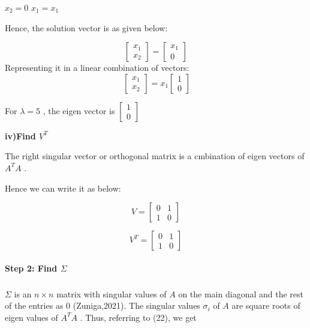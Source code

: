 \documentclass[a4paper]{report}
\begin{document}
$x_2=0$
$x_1=x_1$ 

Hence, the solution vector is as given below:

\[\begin{bmatrix}
    x_1\\x_2
\end{bmatrix}=\begin{bmatrix}
    x_1\\0
\end{bmatrix}\]
Representing it in a linear combination of vectors:
\[\ \begin{bmatrix}
    x_1\\x_2
\end{bmatrix}=x_1\begin{bmatrix}
    1\\0
\end{bmatrix}\]

For $\lambda = 5$ , the eigen vector is $\left [\begin{array}{c}
     1  \\
     0 
\end{array}\right]$

\vspace{10mm}

\textbf{iv)Find $V^T$}

The right singular vector or orthogonal matrix is a cmbination of eigen vectors of $A^TA$ .

Hence we can write it as below:

\[V=\begin{bmatrix}
    0&1\\1&0
\end{bmatrix}\]

\begin{equation}
 \boxed{ V^T=\begin{bmatrix}
    0&1\\1&0
\end{bmatrix}}
\end{equation}

\paragraph{Step 2: Find $\Sigma$}

\subparagraph{}

$\Sigma$ is an $n\times n$ matrix with singular values of $A$ on the main diagonal and the rest of the entries as 0 (Zuniga,2021).
The singular values $\sigma_i$  of $A$ are square roots of eigen values of $A^TA$ .
Thus, referring to (22), we get
\end{document}
